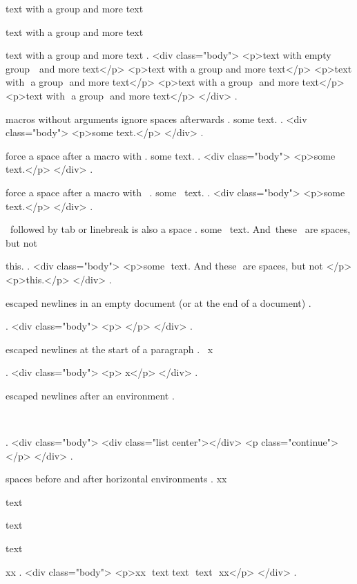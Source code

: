 text with { a group } and more text

text with { a group  } and more text

text with {  a group  }  and more text
.
<div class="body">
<p>text with empty group ​ ​ and more text</p>
<p>text with a group​ and more text</p>
<p>text with ​ a group ​ and more text</p>
<p>text with ​ a group ​ and more text</p>
<p>text with ​ a group ​ and more text</p>
</div>
.


macros without arguments ignore spaces afterwards
.
some \empty  text.
.
<div class="body">
<p>some text.</p>
</div>
.


force a space after a macro with {}
.
some \empty{} text.
.
<div class="body">
<p>some ​ text.</p>
</div>
.


force a space after a macro with \
.
some \empty\ text.
.
<div class="body">
<p>some ​ text.</p>
</div>
.


\ followed by tab or linebreak is also a space
.
some \empty\
text. And\	these
\
are spaces, but not\

this.
.
<div class="body">
<p>some ​ text. And​ these ​ are spaces, but not​ </p>
<p>this.</p>
</div>
.


escaped newlines in an empty document (or at the end of a document)
.
\


.
<div class="body">
<p>​ </p>
</div>
.


escaped newlines at the start of a paragraph
.
\
x

.
<div class="body">
<p>​ x</p>
</div>
.


escaped newlines after an environment
.
\begin{center}
\end{center}
\

.
<div class="body">
<div class="list center"></div>
<p class="continue">​ </p>
</div>
.


spaces before and after horizontal environments
.
xx
\begin{empty}
  text\begin{empty}
    text
  \end{empty}
  \begin{empty}text
  \end{empty}
\end{empty}
xx
.
<div class="body">
<p>xx ​ text​ text ​ text ​ ​ xx</p>
</div>
.
